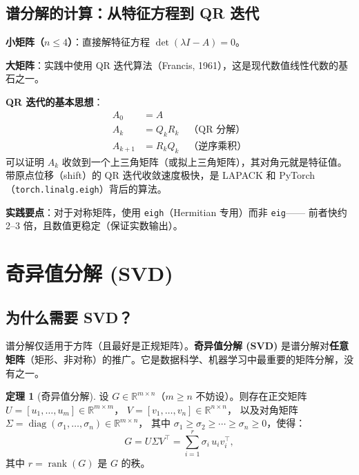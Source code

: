 \documentclass[12pt,a4paper]{ctexart}
\theoremstyle{definition}
\newtheorem{theorem}{定理}[section]
\theoremstyle{plain}
\newcommand{\R}{\mathbb{R}}
\newcommand{\diag}{\operatorname{diag}}
\DeclareMathOperator{\rank}{rank}
\begin{document}
\subsection{谱分解的计算：从特征方程到 QR 迭代}

\textbf{小矩阵（$n\le4$）}：直接解特征方程 $\det(\lambda I-A)=0$。

\textbf{大矩阵}：实践中使用 QR 迭代算法（Francis, 1961），这是现代数值线性代数的基石之一。

\vspace{0.2cm}
\textbf{QR 迭代的基本思想}：
\begin{align*}
  A_0 &= A \\
  A_k &= Q_k R_k \quad\text{（QR 分解）} \\
  A_{k+1} &= R_k Q_k \quad\text{（逆序乘积）}
\end{align*}
可以证明 $A_k$ 收敛到一个上三角矩阵（或拟上三角矩阵），其对角元就是特征值。带原点位移（shift）的 QR 迭代收敛速度极快，是 LAPACK 和 PyTorch（\texttt{torch.linalg.eigh}）背后的算法。

\textbf{实践要点}：对于对称矩阵，使用 \texttt{eigh}（Hermitian 专用）而非 \texttt{eig}——
前者快约 2--3 倍，且数值更稳定（保证实数输出）。

\section{奇异值分解 (SVD)}

\subsection{为什么需要 SVD？}

谱分解仅适用于方阵（且最好是正规矩阵）。\textbf{奇异值分解 (SVD)} 是谱分解对\textbf{任意矩阵}（矩形、非对称）的推广。它是数据科学、机器学习中最重要的矩阵分解，没有之一。

\begin{theorem}[奇异值分解]\label{thm:svd}
  设 $G\in\R^{m\times n}$（$m\ge n$ 不妨设）。则存在正交矩阵
  $U=[u_1,\ldots,u_m]\in\R^{m\times m}$，
  $V=[v_1,\ldots,v_n]\in\R^{n\times n}$，
  以及对角矩阵 $\Sigma=\diag(\sigma_1,\ldots,\sigma_n)\in\R^{m\times n}$，
  其中 $\sigma_1\ge\sigma_2\ge\cdots\ge\sigma_n\ge0$，使得：
  \begin{equation}\label{eq:svd}
    \boxed{G = U\Sigma V^\top = \sum_{i=1}^{r} \sigma_i\, u_i v_i^\top},
  \end{equation}
  其中 $r=\rank(G)$ 是 $G$ 的秩。
\end{theorem}
\end{document}
